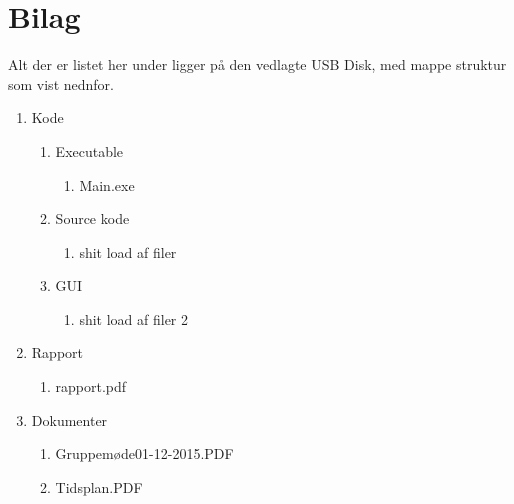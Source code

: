 \appendix
\section{Bilag} \hfill
Alt der er listet her under ligger på den vedlagte USB Disk, med mappe struktur som vist nednfor.

\begin{enumerate}[noitemsep]
	\item Kode
	\begin{enumerate}[noitemsep]
		\item Executable
		\begin{enumerate}[noitemsep]
			\item Main.exe
		\end{enumerate}
		\item Source kode
		\begin{enumerate}[noitemsep]
			\item shit load af filer
		\end{enumerate}
		\item GUI
		\begin{enumerate}[noitemsep]
			\item shit load af filer 2
		\end{enumerate}
	\end{enumerate}
	\item Rapport
	\begin{enumerate}[noitemsep]
		\item rapport.pdf
	\end{enumerate}
	\item Dokumenter
	\begin{enumerate}[noitemsep]
		\item Gruppemøde01-12-2015.PDF \label{itm:Modereferat1}
		\item Tidsplan.PDF \label{itm:Tidsplan1}
	\end{enumerate}
\end{enumerate}